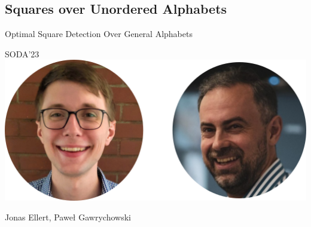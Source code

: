 
\subsection{Squares over Unordered Alphabets}
\newcommand{\absolute}[1]{\left\lvert#1\right\rvert}
\newcommand{\orderof}[1]{\mathcal{O}(#1)}

\begin{frame}
    \centering
    {\Large Optimal Square Detection  Over General Alphabets}
  
    \bigskip
    {\large SODA'23}\\
    \bigskip
    \includegraphics{pictures/mindmap/squares.png}
  
    \bigskip
    Jonas Ellert, Paweł Gawrychowski
\end{frame}




